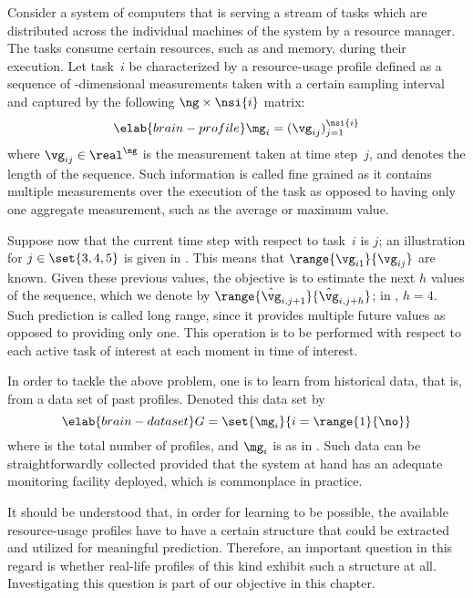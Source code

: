 Consider a system of computers that is serving a stream of tasks which are
distributed across the individual machines of the system by a resource manager.
The tasks consume certain resources, such as  and memory, during their
execution. Let task~$i$ be characterized by a resource-usage profile defined as
a sequence of \ng-dimensional measurements taken with a certain sampling
interval and captured by the following $\ng \times \nsi{i}$ matrix:
\begin{equation} \elab{brain-profile}
  \mg_i = (\vg_{ij})_{j = 1}^\nsi{i}
\end{equation}
where $\vg_{ij} \in \real^\ng$ is the measurement taken at time step~$j$, and
 denotes the length of the sequence. Such information is called fine
grained as it contains multiple measurements over the execution of the task as
opposed to having only one aggregate measurement, such as the average or maximum
value.

Suppose now that the current time step with respect to task~$i$ is $j$; an
illustration for $j \in \set{3, 4, 5}$ is given in .
This means that $\range{\vg_{i1}}{\vg_{ij}}$ are known. Given these previous
values, the objective is to estimate the next $h$ values of the sequence, which
we denote by $\range{\hat{\vg}_{i, j + 1}}{\hat{\vg}_{i, j + h}}$; in
, $h = 4$. Such prediction is called long range, since
it provides multiple future values as opposed to providing only one. This
operation is to be performed with respect to each active task of interest at
each moment in time of interest.

In order to tackle the above problem, one is to learn from historical data, that
is, from a data set of past profiles. Denoted this data set by
\begin{equation} \elab{brain-dataset}
  G = \set{\mg_i}{i = \range{1}{\no}}
\end{equation}
where \no is the total number of profiles, and $\mg_i$ is as in
. Such data can be straightforwardly collected provided that
the system at hand has an adequate monitoring facility deployed, which is
commonplace in practice.

It should be understood that, in order for learning to be possible, the
available resource-usage profiles have to have a certain structure that could be
extracted and utilized for meaningful prediction. Therefore, an important
question in this regard is whether real-life profiles of this kind exhibit such
a structure at all. Investigating this question is part of our objective in this
chapter.
